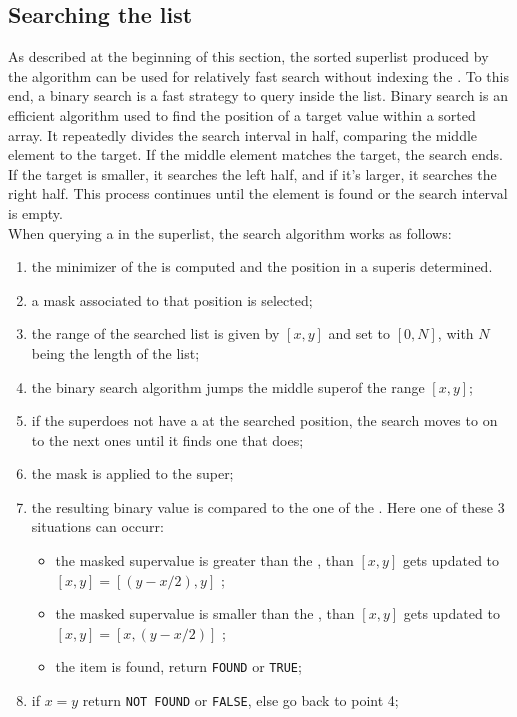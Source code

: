 \subsection{Searching the list}
As described at the beginning of this section, the sorted super\kmer list produced by the algorithm can be used for relatively fast search without indexing the \kmers. To this end, a binary search is a fast strategy to query \kmers inside the list. Binary search is an efficient algorithm used to find the position of a target value within a sorted array. It repeatedly divides the search interval in half, comparing the middle element to the target. If the middle element matches the target, the search ends. If the target is smaller, it searches the left half, and if it's larger, it searches the right half. This process continues until the element is found or the search interval is empty.\\
When querying a \kmer in the super\kmer list, the search algorithm works as follows:
\begin{enumerate}
	\item the minimizer of the \kmers is computed and the \kmer position in a super\kmer is determined.
	\item a mask associated to that position is selected;
	\item the range of the searched list is given by $[x,y]$ and set to $[0,N]$, with $N$ being the length of the list;
	\item the binary search algorithm jumps the middle super\kmer of the range $[x,y]$;
	\item if the super\kmer does not have a \kmer at the searched position, the search moves to on to the next ones until it finds one that does;
	\item the mask is applied to the super\kmer;
	\item the resulting binary value is compared to the one of the \kmer. Here one of these 3 situations can occurr:
	\begin{itemize}
		\item the masked super\kmer value is greater than the \kmer, than $[x,y]$ gets updated to $[x,y] = [(y-x/2),y]$ ;
		\item the masked super\kmer value is smaller than the \kmer, than $[x,y]$ gets updated to $[x,y] = [x,(y-x/2)]$ ;
		\item the item is found, return \texttt{FOUND} or \texttt{TRUE};
	\end{itemize}
	\item if $x = y$ return \texttt{NOT FOUND} or \texttt{FALSE}, else go back to point 4;
\end{enumerate}
